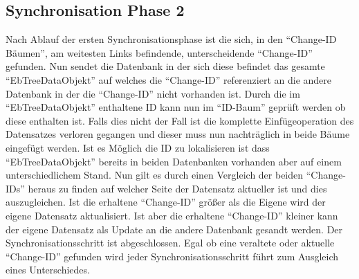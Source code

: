 \documentclass[a4paper,11pt,oneside,%
headsepline,												%
footsepline,												%
bibtotocnumbered									%
]{scrreprt}
\begin{document}
\subsection{Synchronisation Phase 2}
Nach Ablauf der ersten Synchronisationsphase ist die sich, in den \enquote{Change-ID Bäumen}, am weitesten Links befindende, unterscheidende \enquote{Change-ID} gefunden. Nun sendet die Datenbank in der sich diese befindet das gesamte \enquote{EbTreeDataObjekt} auf welches die \enquote{Change-ID} referenziert an die andere Datenbank in der die \enquote{Change-ID} nicht vorhanden ist. Durch die im \enquote{EbTreeDataObjekt} enthaltene \ac{ID} kann nun im  \enquote{ID-Baum} geprüft werden ob diese enthalten ist. Falls dies nicht der Fall ist die komplette Einfügeoperation des Datensatzes verloren gegangen und dieser muss nun nachträglich in beide Bäume eingefügt werden. Ist es Möglich die \ac{ID} zu lokalisieren ist dass \enquote{EbTreeDataObjekt} bereits in beiden Datenbanken vorhanden aber auf einem unterschiedlichem Stand. Nun gilt es durch einen Vergleich der beiden \enquote{Change-IDs} heraus zu finden auf welcher Seite der Datensatz aktueller ist und dies auszugleichen. Ist die erhaltene \enquote{Change-ID} größer als die Eigene wird der eigene Datensatz aktualisiert. Ist aber die erhaltene \enquote{Change-ID} kleiner kann der eigene Datensatz als Update an die andere Datenbank gesandt werden. Der Synchronisationsschritt ist abgeschlossen. Egal ob eine veraltete oder aktuelle  \enquote{Change-ID} gefunden wird jeder Synchronisationsschritt führt zum Ausgleich eines Unterschiedes.
	
\end{document}
